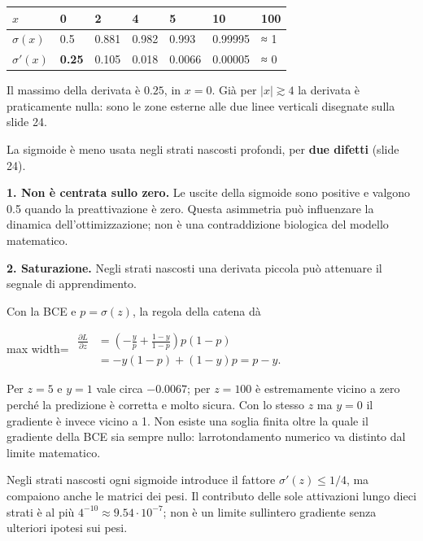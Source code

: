 \documentclass[11pt,a4paper,oneside,openany]{book}
\begin{document}
\begin{longtable}[]{@{}lllllll@{}}
\toprule\noalign{}
\(x\) & 0 & 2 & 4 & 5 & 10 & 100 \\
\midrule\noalign{}
\endhead
\bottomrule\noalign{}
\endlastfoot
\(\sigma(x)\) & 0.5 & 0.881 & 0.982 & 0.993 & 0.99995 & ≈ 1 \\
\(\sigma'(x)\) & \textbf{0.25} & 0.105 & 0.018 & 0.0066 & 0.00005 & ≈ 0 \\
\end{longtable}

Il massimo della derivata è \(0.25\), in \(x = 0\). Già per \(|x| \gtrsim 4\) la derivata è praticamente nulla: sono le zone esterne alle due linee verticali disegnate sulla slide 24.

La sigmoide è meno usata negli strati nascosti profondi, per \textbf{due difetti} (slide 24).

\textbf{1. Non è centrata sullo zero.} Le uscite della sigmoide sono positive e valgono 0.5 quando la preattivazione è zero. Questa asimmetria può influenzare la dinamica dell'ottimizzazione; non è una contraddizione biologica del modello matematico.

\textbf{2. Saturazione.} Negli strati nascosti una derivata piccola può attenuare il segnale di apprendimento.

Con la BCE e \(p=\sigma(z)\), la regola della catena dà \begin{center}
\begin{adjustbox}{max width=\linewidth}
$\displaystyle 
\begin{aligned}
\frac{\partial L}{\partial z}
&=\left(-\frac{y}{p}+\frac{1-y}{1-p}\right)p(1-p)\\
&=-y(1-p)+(1-y)p=p-y.
\end{aligned}
$
\end{adjustbox}
\end{center} Per \(z=5\) e \(y=1\) vale circa \(-0.0067\); per \(z=100\) è estremamente vicino a zero perché la predizione è corretta e molto sicura. Con lo stesso \(z\) ma \(y=0\) il gradiente è invece vicino a 1. Non esiste una soglia finita oltre la quale il gradiente della BCE sia sempre nullo: l\textquotesingle arrotondamento numerico va distinto dal limite matematico.

Negli strati nascosti ogni sigmoide introduce il fattore \(\sigma'(z)\leq1/4\), ma compaiono anche le matrici dei pesi. Il contributo delle sole attivazioni lungo dieci strati è al più \(4^{-10}\approx9.54\cdot10^{-7}\); non è un limite sull\textquotesingle intero gradiente senza ulteriori ipotesi sui pesi.
\end{document}
